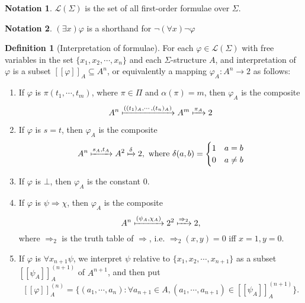 \documentclass[a4paper]{article}
\theoremstyle{definition}
\newtheorem*{defi}{Definition}
\newtheorem*{notation}{Notation}
\newcommand{\La}{\mathcal{L}}
\begin{document}
\begin{notation}
  $\La(\Sigma)$ is the set of all first-order formulae over $\Sigma$.
\end{notation}

\begin{notation}
  $(\exists x)\varphi$ is a shorthand for $\neg (\forall x)\neg \varphi$
\end{notation}

\begin{defi}[Interpretation of formulae]
  For each $\varphi\in \La(\Sigma)$ with free variables in the set $\{x_1, x_2, \cdots, x_n\}$ and each $\Sigma$-structure $A$, and interpretation of $\varphi$ is a subset $[\![\varphi]\!]_A\subseteq A^n$, or equivalently a mapping $\varphi_A: A^n\to 2$ as follows:
  \begin{enumerate}
  \item If $\varphi$ is $\pi(t_1, \cdots, t_m)$, where $\pi \in \Pi$ and $\alpha(\pi) = m$, then $\varphi_A$ is the composite
$$A^n\xmapsto{((t_1)_A,\cdots,(t_n)_A)}A^m\xmapsto{\pi_A}2$$
  \item If $\varphi$ is $s = t$, then $\varphi_A$ is the composite
$$A^n\xmapsto{s_A,t_A}A^2 \xmapsto{\delta}2,\text{ where }\delta(a, b) = 
    \begin{cases}
      1 & a = b\\
      0 & a\not= b
    \end{cases}$$
  \item If $\varphi$ is $\bot$, then $\varphi_A$ is the constant $0$.
  \item If $\varphi$ is $\psi\Rightarrow \chi$, then $\varphi_A$ is the composite
$$A^n\xmapsto{(\psi_A,\chi_A)}2^2\xmapsto{\Rightarrow_2} 2,$$
    where $\Rightarrow_2$ is the truth table of $\Rightarrow$, i.e. $\Rightarrow_2(x, y) =0 $ iff $x = 1, y = 0$.
  \item If $\varphi$ is $\forall x_{n + 1}\psi$, we interpret $\psi$ relative to $\{x_1, x_2, \cdots, x_{n + 1}\}$ as a subset $[\![\psi_A]\!]_A^{(n + 1)}$ of $A^{n + 1}$, and then put 
    $$[\![\varphi]\!]_A^{(n)} = \{(a_1, \cdots, a_n): \forall a_{n + 1}\in A, (a_1, \cdots, a_{n + 1})\in [\![\psi_A]\!]_A^{(n + 1)}\}.$$
  \end{enumerate}
\end{defi}
\end{document}
